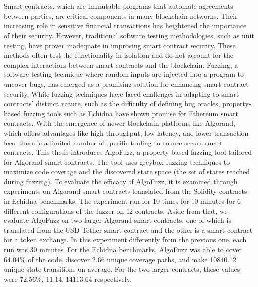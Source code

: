\chapter{\abstractname}
Smart contracts, which are immutable programs that automate agreements between parties, are critical components in many blockchain networks. Their increasing role in sensitive financial transactions has heightened the importance of their security.
However, traditional software testing methodologies, such as unit testing, have proven inadequate in improving smart contract security.
These methods often test the functionality in isolation and do not account for the complex interactions between smart contracts and the blockchain.
Fuzzing, a software testing technique where random inputs are injected into a program to uncover bugs, has emerged as a promising solution for enhancing smart contract security.
While fuzzing techniques have faced challenges in adapting to smart contracts' distinct nature, such as the difficulty of defining bug oracles, property-based fuzzing tools such as Echidna have shown promise for Ethereum smart contracts.
With the emergence of newer blockchain platforms like Algorand, which offers advantages like high throughput, low latency, and lower transaction fees, there is a limited number of specific tooling to ensure secure smart contracts.
This thesis introduces AlgoFuzz, a property-based fuzzing tool tailored for Algorand smart contracts.
The tool uses greybox fuzzing techniques to maximize code coverage and the discovered state space (the set of states reached during fuzzing).
To evaluate the efficacy of AlgoFuzz, it is examined through experiments on Algorand smart contracts translated  from the Solidity contracts in Echidna benchmarks. The experiment ran for 10 times for 10 minutes for 6 different configurations of the fuzzer on 12 contracts.
Aside from that, we evaluate AlgoFuzz on two larger Algorand smart contracts, one of which is translated from the USD Tether smart contract and the other is a smart contract for a token exchange.
In this experiment differently from the previous one, each run was 30 minutes.
For the Echidna benchmarks, AlgoFuzz was able to cover 64.04\% of the code, discover 2.66 unique coverage paths, and make 10840.12 unique state transitions on average. For the two larger contracts, these values were 72.56\%, 11.14, 14113.64 respectively.

